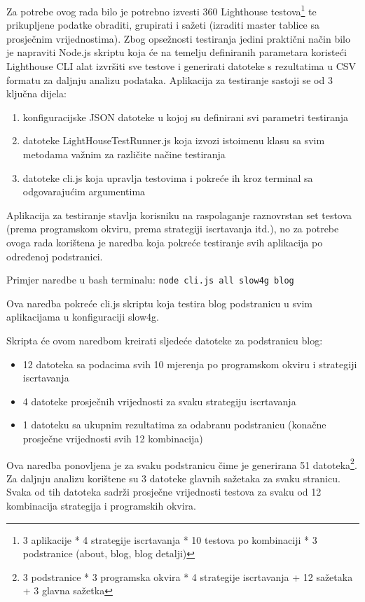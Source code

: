Za potrebe ovog rada bilo je potrebno izvesti 360 Lighthouse testova\footnote{3 aplikacije * 4 strategije iscrtavanja * 10 testova po kombinaciji * 3 podstranice (about, blog, blog detalji)} te prikupljene podatke obraditi, grupirati i sažeti (izraditi master tablice sa prosječnim vrijednostima). Zbog opsežnosti testiranja jedini praktični način bilo je napraviti Node.js skriptu koja će na temelju definiranih parametara koristeći Lighthouse CLI alat izvršiti sve testove i generirati datoteke s rezultatima u CSV formatu za daljnju analizu podataka.
Aplikacija za testiranje sastoji se od 3 ključna dijela:
\begin{enumerate}
    \item konfiguracijske JSON datoteke u kojoj su definirani svi parametri testiranja
    \item datoteke LightHouseTestRunner.js koja izvozi istoimenu klasu sa svim metodama važnim za različite načine testiranja
    \item datoteke cli.js koja upravlja testovima i pokreće ih kroz terminal sa odgovarajućim argumentima
\end{enumerate}

Aplikacija za testiranje stavlja korisniku na raspolaganje raznovrstan set testova (prema programskom okviru, prema strategiji iscrtavanja itd.), no za potrebe ovoga rada korištena je naredba koja pokreće testiranje svih aplikacija po određenoj podstranici.

\bigskip

Primjer naredbe u bash terminalu:
\texttt{node cli.js all slow4g blog}

Ova naredba pokreće cli.js skriptu koja testira blog podstranicu u svim aplikacijama u konfiguraciji slow4g.

\bigskip
Skripta će ovom naredbom kreirati sljedeće datoteke za podstranicu blog:
\begin{itemize}
    \item 12 datoteka sa podacima svih 10 mjerenja po programskom okviru i strategiji iscrtavanja
    \item 4 datoteke prosječnih vrijednosti za svaku strategiju iscrtavanja
    \item 1 datoteku sa ukupnim rezultatima za odabranu podstranicu (konačne prosječne vrijednosti svih 12 kombinacija)
\end{itemize}
Ova naredba ponovljena je za svaku podstranicu čime je generirana 51 datoteka\footnote{3 podstranice * 3 programska okvira * 4 strategije iscrtavanja + 12 sažetaka + 3 glavna sažetka}.
Za daljnju analizu korištene su 3 datoteke glavnih sažetaka za svaku stranicu. Svaka od tih datoteka sadrži prosječne vrijednosti testova za svaku od 12 kombinacija strategija i programskih okvira.

